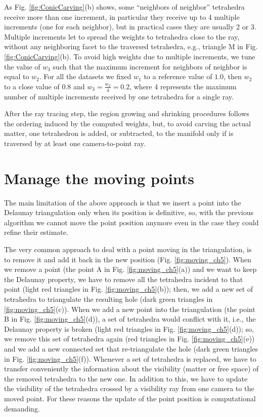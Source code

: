 As Fig. \ref{fig:ConicCarving}(b) shows, some ``neighbors of neighbor'' tetrahedra receive more than one increment, in particular they receive up to 4 multiple increments (one for each neighbor), but in practical cases they are usually 2 or 3.
Multiple increments let to spread the weights to tetrahedra close to the ray, without any  neighboring facet to the traversed tetrahedra, e.g.,  triangle M in Fig. \ref{fig:ConicCarving}(b).
To avoid high weights due to multiple increments, we tune the value of $w_3$ such that the maximum increment for neighbors of neighbor is equal to $w_2$.
For all the datasets we fixed $w_1$ to a reference value of $1.0$, then $w_2$ to a close value of $0.8$ and $w_3 = \frac{w_2}{4} = 0.2$, where 4 represents the maximum number of multiple increments received by one tetrahedra for a single ray. 


After the ray tracing step, the region growing and shrinking procedures follows the ordering induced by the computed weights, but, to avoid carving the actual matter, one tetrahedron is added, or subtracted, to the manifold only if is traversed by at least one camera-to-point ray.




\section{Manage the moving points}

The main limitation of the above approach is that we insert a point into the Delaunay triangulation only when its position is definitive, so, with the previous algorithm we cannot move the point position anymore even in the case they could refine their estimate. 

The very common approach to deal with a point moving in the triangulation, is to remove it and add it back in the new position \cite{cgal} (Fig. \ref{fig:moving_ch5}). 
When we remove a point (the point A in Fig. \ref{fig:moving_ch5}(a)) and we want to keep the Delaunay property, we have to remove all the tetrahedra incident to that point (light red triangles in Fig. \ref{fig:moving_ch5}(b)); then, we add a new set of tetrahedra to triangulate the resulting hole (dark green triangles in \ref{fig:moving_ch5}(c)).
When we add a new point into the triangulation  (the point B in Fig. \ref{fig:moving_ch5}(d)), a set of tetrahedra would conflict with it, i.e., the Delaunay property is broken (light red triangles in Fig. \ref{fig:moving_ch5}(d)); so, we remove this set of tetrahedra again (red triangles in Fig. \ref{fig:moving_ch5}(e)) and we add a new connected set that re-triangulate the hole (dark green triangles in Fig. \ref{fig:moving_ch5}(f)).
Whenever a set of tetrahedra is replaced, we have to transfer conveniently the information about the visibility (matter or free space) of the removed tetrahedra to the new one. 
In addition to this, we have to update the visibility of the tetrahedra crossed by a visibility ray from one camera to the moved point.
For these reasons the update of the point position is computational demanding.

